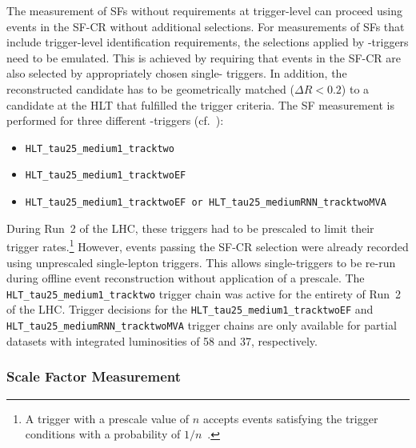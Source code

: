 The measurement of SFs without requirements at trigger-level can proceed using
events in the SF-CR without additional selections. For measurements of SFs that
include trigger-level identification requirements, the selections applied by
\tauhadvis-triggers need to be emulated. This is achieved by requiring that
events in the SF-CR are also selected by appropriately chosen single-\tauhadvis
triggers. In addition, the reconstructed \tauhadvis candidate has to be
geometrically matched ($\Delta R < 0.2$) to a \tauhadvis candidate at the HLT
that fulfilled the trigger criteria. The SF measurement is performed for three
different \tauhadvis-triggers (cf.\ ):
\begin{itemize}
\item \verb|HLT_tau25_medium1_tracktwo| %
\item \verb|HLT_tau25_medium1_tracktwoEF| %
\item \verb|HLT_tau25_medium1_tracktwoEF or HLT_tau25_mediumRNN_tracktwoMVA|
\end{itemize}
During Run~2 of the LHC, these triggers had to be prescaled to limit their
trigger rates.\footnote{A trigger with a prescale value of $n$ accepts events
  satisfying the trigger conditions with a probability of
  $1 / n$~\cite{TRIG-2019-04}.} However, events passing the SF-CR selection were
already recorded using unprescaled single-lepton triggers. This allows
single-\tauhadvis triggers to be re-run during offline event reconstruction
without application of a prescale.
The \verb|HLT_tau25_medium1_tracktwo| trigger chain was active for the entirety
of Run~2 of the LHC. Trigger decisions for the
\verb|HLT_tau25_medium1_tracktwoEF| and \verb|HLT_tau25_mediumRNN_tracktwoMVA|
trigger chains are only available for partial datasets with integrated
luminosities of \SI{58}{\ifb} and \SI{37}{\ifb}, respectively.


\subsubsection{Scale Factor Measurement}

